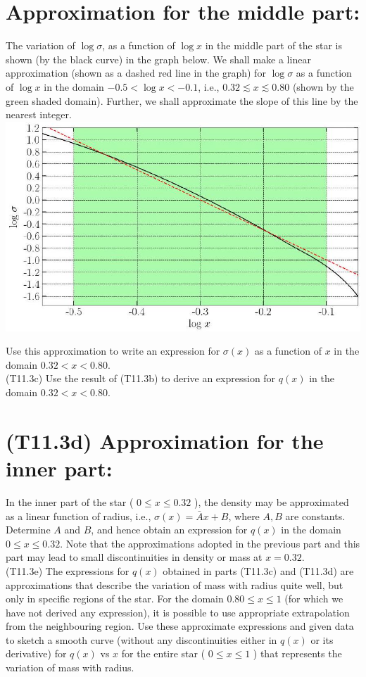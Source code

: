 \documentclass[10pt]{article}
\begin{document}
    \section*{Approximation for the middle part:}
    The variation of $\log \sigma$, as a function of $\log x$ in the middle part of the star is shown (by the black curve) in the graph below. We shall make a linear approximation (shown as a dashed red line in the graph) for $\log \sigma$ as a function of $\log x$ in the domain $-0.5<\log x<-0.1$, i.e., $0.32 \lesssim x \lesssim 0.80$ (shown by the green shaded domain). Further, we shall approximate the slope of this line by the nearest integer.\\
    \includegraphics[max width=\textwidth, center]{2025_08_23_e94579452776a99c4850g-16}
    
    Use this approximation to write an expression for $\sigma(x)$ as a function of $x$ in the domain $0.32<x<0.80$.\\
    (T11.3c) Use the result of (T11.3b) to derive an expression for $q(x)$ in the domain $0.32<x<0.80$.
    
    \section*{(T11.3d) Approximation for the inner part:}
    In the inner part of the star ( $0 \leq x \leq 0.32$ ), the density may be approximated as a linear function of radius, i.e., $\sigma(x)=\bar{A} x+B$, where $A, B$ are constants. Determine $A$ and $B$, and hence obtain an expression for $q(x)$ in the domain $0 \leq x \leq 0.32$. Note that the approximations adopted in the previous part and this part may lead to small discontinuities in density or mass at $x=0.32$.\\
    (T11.3e) The expressions for $q(x)$ obtained in parts (T11.3c) and (T11.3d) are approximations that describe the variation of mass with radius quite well, but only in specific regions of the star. For the domain $0.80 \leq x \leq 1$ (for which we have not derived any expression), it is possible to use appropriate extrapolation from the neighbouring region. Use these approximate expressions and given data to sketch a smooth curve (without any discontinuities either in $q(x)$ or its derivative) for $q(x)$ vs $x$ for the entire star ( $0 \leq x \leq 1$ ) that represents the variation of mass with radius.
\end{document}
